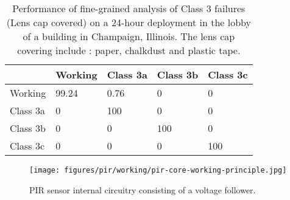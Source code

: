 \begin{table}[h]\small
        \centering
        \caption{Performance of fine-grained analysis of Class 3 failures (Lens cap covered) on a 24-hour deployment in the lobby of a building in Champaign, Illinois. The lens cap covering include : \ca paper, \cb chalkdust and \cc plastic tape.}
        \begin{tabular}{p{1.0cm}p{1.2cm}p{1.2cm}p{1.2cm}p{1.2cm}}
            \hline
            \textbf{} & \textbf{Working} & \textbf{Class 3a} & \textbf{Class 3b} & \textbf{Class 3c} \\
            \hline \hline
            \rowcolor{gray!20} Working & 99.24 & 0.76 & 0 & 0 \\
            Class 3a & 0 & 100 & 0 & 0 \\
            \rowcolor{gray!20} Class 3b & 0 & 0 & 100 & 0 \\
            Class 3c & 0 & 0 & 0 & 100\\
            \hline 
        \end{tabular}
        \label{tbl:fine_grained_class3_perf}
\end{table}










\begin{figure}[!t]
\centering
\texttt{[image: figures/pir/working/pir-core-working-principle.jpg]}
\caption{PIR sensor internal circuitry consisting of a voltage follower\cite{}.}
\label{fig:pir_sensor_evm}
\end{figure}



